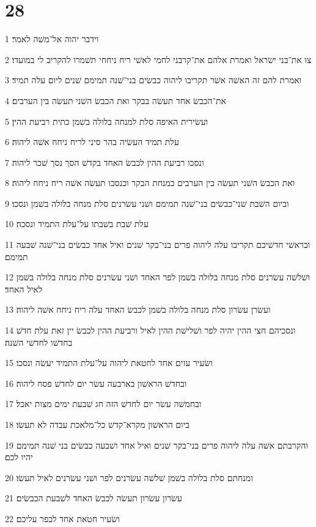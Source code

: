 \chapter{28}

\par 1 וידבר יהוה אל־משׁה לאמר׃
\par 2 צו את־בני ישׂראל ואמרת אלהם את־קרבני לחמי לאשׁי ריח ניחחי תשׁמרו להקריב לי במועדו׃
\par 3 ואמרת להם זה האשׁה אשׁר תקריבו ליהוה כבשׂים בני־שׁנה תמימם שׁנים ליום עלה תמיד׃
\par 4 את־הכבשׂ אחד תעשׂה בבקר ואת הכבשׂ השׁני תעשׂה בין הערבים׃
\par 5 ועשׂירית האיפה סלת למנחה בלולה בשׁמן כתית רביעת ההין׃
\par 6 עלת תמיד העשׂיה בהר סיני לריח ניחח אשׁה ליהוה׃
\par 7 ונסכו רביעת ההין לכבשׂ האחד בקדשׁ הסך נסך שׁכר ליהוה׃
\par 8 ואת הכבשׂ השׁני תעשׂה בין הערבים כמנחת הבקר וכנסכו תעשׂה אשׁה ריח ניחח ליהוה׃
\par 9 וביום השׁבת שׁני־כבשׂים בני־שׁנה תמימם ושׁני עשׂרנים סלת מנחה בלולה בשׁמן ונסכו׃
\par 10 עלת שׁבת בשׁבתו על־עלת התמיד ונסכה׃
\par 11 ובראשׁי חדשׁיכם תקריבו עלה ליהוה פרים בני־בקר שׁנים ואיל אחד כבשׂים בני־שׁנה שׁבעה תמימם׃
\par 12 ושׁלשׁה עשׂרנים סלת מנחה בלולה בשׁמן לפר האחד ושׁני עשׂרנים סלת מנחה בלולה בשׁמן לאיל האחד׃
\par 13 ועשׂרן עשׂרון סלת מנחה בלולה בשׁמן לכבשׂ האחד עלה ריח ניחח אשׁה ליהוה׃
\par 14 ונסכיהם חצי ההין יהיה לפר ושׁלישׁת ההין לאיל ורביעת ההין לכבשׂ יין זאת עלת חדשׁ בחדשׁו לחדשׁי השׁנה׃
\par 15 ושׂעיר עזים אחד לחטאת ליהוה על־עלת התמיד יעשׂה ונסכו׃
\par 16 ובחדשׁ הראשׁון בארבעה עשׂר יום לחדשׁ פסח ליהוה׃
\par 17 ובחמשׁה עשׂר יום לחדשׁ הזה חג שׁבעת ימים מצות יאכל׃
\par 18 ביום הראשׁון מקרא־קדשׁ כל־מלאכת עבדה לא תעשׂו׃
\par 19 והקרבתם אשׁה עלה ליהוה פרים בני־בקר שׁנים ואיל אחד ושׁבעה כבשׂים בני שׁנה תמימם יהיו לכם׃
\par 20 ומנחתם סלת בלולה בשׁמן שׁלשׁה עשׂרנים לפר ושׁני עשׂרנים לאיל תעשׂו׃
\par 21 עשׂרון עשׂרון תעשׂה לכבשׂ האחד לשׁבעת הכבשׂים׃
\par 22 ושׂעיר חטאת אחד לכפר עליכם׃
